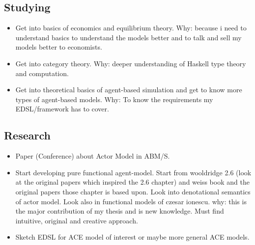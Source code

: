 \documentclass{article}
\begin{document}
\subsection{Studying}
\begin{itemize}
\item Get into basics of economics and equilibrium theory. Why: because i need to understand basics to understand the models better and to talk and sell my models better to economists.
\item Get into category theory. Why: deeper understanding of Haskell type theory and computation.
\item Get into theoretical basics of agent-based simulation and get to know more types of agent-based models. Why: To know the requirements my EDSL/framework has to cover.
\end{itemize}

\subsection{Research}
\begin{itemize}
\item Paper (Conference) about Actor Model in ABM/S.
\item Start developing pure functional agent-model. Start from wooldridge 2.6 (look at the original papers which inspired the 2.6 chapter) and weiss book and the original papers those chapter is based upon. Look into denotational semantics of actor model. Look also in functional models of czesar ionescu. why: this is the major contribution of my thesis and is new knowledge. Must find intuitive, original and creative approach.
\item Sketch EDSL for ACE model of interest or maybe more general ACE models.
\end{itemize}





\end{document}
